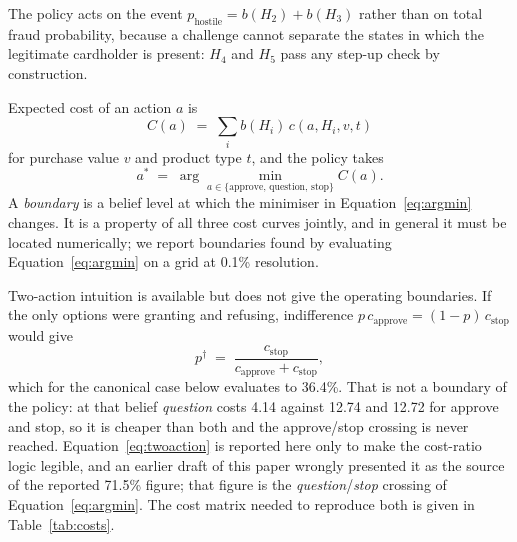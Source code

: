 \documentclass{article}
\begin{document}
The policy acts on the event $p_{\text{hostile}} = b(H_2) + b(H_3)$ rather than on total
fraud probability, because a challenge cannot separate the states in which the legitimate
cardholder is present: $H_4$ and $H_5$ pass any step-up check by construction.

Expected cost of an action $a$ is
\begin{equation}
C(a) \;=\; \sum_i b(H_i)\, c(a, H_i, v, t)
\end{equation}
for purchase value $v$ and product type $t$, and the policy takes
\begin{equation}
a^{*} \;=\; \arg\min_{a \in \{\text{approve},\,\text{question},\,\text{stop}\}} C(a).
\label{eq:argmin}
\end{equation}
A \emph{boundary} is a belief level at which the minimiser in
Equation~\ref{eq:argmin} changes. It is a property of all three cost curves jointly, and
in general it must be located numerically; we report boundaries found by evaluating
Equation~\ref{eq:argmin} on a grid at 0.1\% resolution.

Two-action intuition is available but does not give the operating boundaries. If the only
options were granting and refusing, indifference
$p\,c_{\text{approve}} = (1-p)\,c_{\text{stop}}$ would give
\begin{equation}
p^{\dagger} \;=\; \frac{c_{\text{stop}}}{c_{\text{approve}} + c_{\text{stop}}},
\label{eq:twoaction}
\end{equation}
which for the canonical case below evaluates to 36.4\%. That is not a boundary of the
policy: at that belief \emph{question} costs 4.14 against 12.74 and 12.72 for approve and
stop, so it is cheaper than both and the approve/stop crossing is never reached.
Equation~\ref{eq:twoaction} is reported here only to make the cost-ratio logic legible,
and an earlier draft of this paper wrongly presented it as the source of the reported
71.5\% figure; that figure is the \emph{question}/\emph{stop} crossing of
Equation~\ref{eq:argmin}. The cost matrix needed to reproduce both is given in
Table~\ref{tab:costs}.
\end{document}
